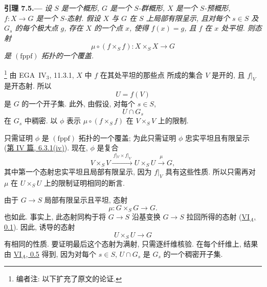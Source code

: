 
\medskip
{}\label{lem:sga3-VIB-7.5}%
\noindent\textbf{引理 7.5.---}
\emph{设 \(S\) 是一个概形, \(G\) 是一个 \(S\)-群概形,
\(X\) 是一个 \(S\)-预概形, \(f:X\to G\) 是一个 \(S\)-态射.
假设 \(X\) 与 \(G\) 在 \(S\) 上局部有限呈示,
且对每个 \(s\in S\) 及 \(G_s\) 的每个极大点 \(g\),
存在 \(X\) 的一个点 \(x\), 使得 \(f(x)=g\),
且 \(f\) 在 \(x\) 处平坦. 则态射}
\label{form:sga3-VIB-7.5-covering-morphism}%
\[
  \mu\circ(f\times_S f):
  X\times_S X\longrightarrow G
\]
\emph{是 \((\mathrm{fppf})\) 拓扑的一个覆盖.}

\footnote{\label{note:sga3-VIB-75}编者注: 以下扩充了原文的论证.}
由 EGA~IV\(_3\), 11.3.1, \(X\) 中 \(f\) 在其处平坦的那些点
所成的集合 \(V\) 是开的, 且 \(f|_V\) 是开态射. 所以
\[
  U=f(V)
\]
是 \(G\) 的一个开子集. 此外, 由假设, 对每个 \(s\in S\),
\[
  U\cap G_s
\]
在 \(G_s\) 中稠密.
以 \(\phi\) 表示 \(\mu\circ(f\times_S f)\)
在 \(V\times_S V\) 上的限制.

只需证明 \(\phi\) 是 \((\mathrm{fppf})\) 拓扑的一个覆盖;
为此只需证明 \(\phi\) 忠实平坦且有限呈示
(\hyperref[sga3:iv:proposition:6:3:1:item:iv:01]
{第 IV 篇, 6.3.1\textup{(iv)}}).
现在, \(\phi\) 是复合
\label{form:sga3-VIB-7.5-factorization}%
\[
  V\times_S V
  \xrightarrow{\ f|_V\times f|_V\ }
  U\times_S U
  \xrightarrow{\ \mu\ }
  G,
\]
其中第一个态射忠实平坦且局部有限呈示, 因为 \(f|_V\) 具有这些性质.
所以只需再对 \(\mu\) 在 \(U\times_S U\) 上的限制证明相同的断言.

由于 \(G\to S\) 局部有限呈示且平坦, 态射
\[
  \mu:G\times_S G\longrightarrow G.
\]
也如此. 事实上, 此态射同构于将 \(G\to S\)
沿基变换 \(G\to S\) 拉回所得的态射
(\hyperref[sga3:VIA:0.1]{VI\(_A\), 0.1}).
因此, 诱导的态射
\[
  U\times_S U\longrightarrow G
\]
有相同的性质. 要证明最后这个态射为满射, 只需逐纤维核验.
在每个纤维上, 结果由 \hyperref[sga3:VIA:0.5]{VI\(_A\), 0.5} 得到,
因为对每个 \(s\in S\), \(U\cap G_s\) 是 \(G_s\) 的一个稠密开子集.

